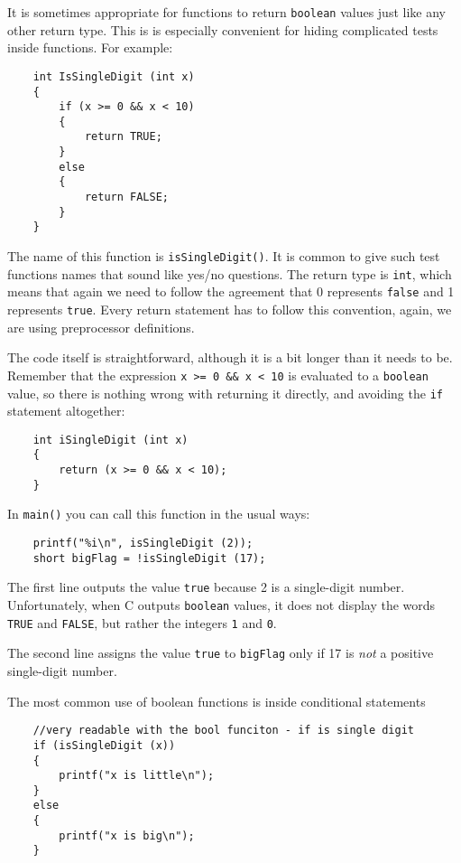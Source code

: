 It is sometimes appropriate for functions to return {\tt boolean} values just 
like any other return type. This is 
is especially convenient for hiding complicated tests inside
functions.  For example:

\begin{verbatim}
    int IsSingleDigit (int x)
    {
        if (x >= 0 && x < 10) 
        {
            return TRUE;
        } 
        else 
        {
            return FALSE;
        }
    }
\end{verbatim}
%
The name of this function is {\tt isSingleDigit()}.  It is common
to give such test functions names that sound like yes/no questions.
The return type is {\tt int}, which means that again we need
to follow the agreement that  0 represents {\tt false} and 1 
represents {\tt true}. Every return
statement has to follow this convention, again, we are using
preprocessor definitions.

The code itself is straightforward, although it is a bit longer than
it needs to be.  Remember that the expression {\tt x >= 0 \&\& x < 10}
is evaluated to a {\tt boolean} value, so there is nothing wrong with returning it
directly, and avoiding the {\tt if} statement altogether:

\begin{verbatim}
    int iSingleDigit (int x)
    {
        return (x >= 0 && x < 10);
    }
\end{verbatim}
%
In {\tt main()} you can call this function in the usual ways:

\begin{verbatim}
    printf("%i\n", isSingleDigit (2));
    short bigFlag = !isSingleDigit (17);
\end{verbatim}
%
The first line outputs the value {\tt true} because 2 is a
single-digit number.  Unfortunately, when C outputs {\tt boolean} values, it
does not display the words {\tt TRUE} and {\tt FALSE}, but rather the
integers {\tt 1} and {\tt 0}.

The second line assigns the value {\tt true} to {\tt bigFlag}
only if 17 is {\em not} a positive single-digit number.

The most common use of boolean functions is inside conditional
statements

\begin{verbatim}
	//very readable with the bool funciton - if is single digit
    if (isSingleDigit (x))  
    {
        printf("x is little\n");
    } 
    else 
    {
        printf("x is big\n");
    }
\end{verbatim}

